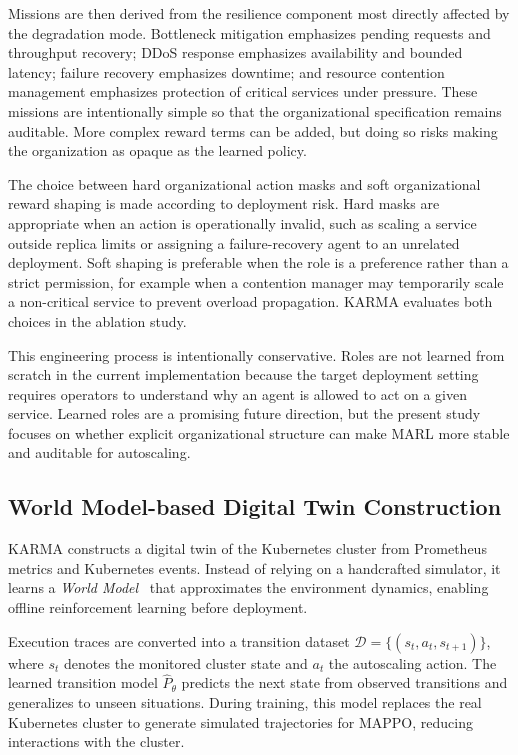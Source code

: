 \documentclass[journal]{IEEEtran}
\begin{document}
Missions are then derived from the resilience component most directly affected by the degradation mode. Bottleneck mitigation emphasizes pending requests and throughput recovery; DDoS response emphasizes availability and bounded latency; failure recovery emphasizes downtime; and resource contention management emphasizes protection of critical services under pressure. These missions are intentionally simple so that the organizational specification remains auditable. More complex reward terms can be added, but doing so risks making the organization as opaque as the learned policy.

The choice between hard organizational action masks and soft organizational reward shaping is made according to deployment risk. Hard masks are appropriate when an action is operationally invalid, such as scaling a service outside replica limits or assigning a failure-recovery agent to an unrelated deployment. Soft shaping is preferable when the role is a preference rather than a strict permission, for example when a contention manager may temporarily scale a non-critical service to prevent overload propagation. KARMA evaluates both choices in the ablation study.

This engineering process is intentionally conservative. Roles are not learned from scratch in the current implementation because the target deployment setting requires operators to understand why an agent is allowed to act on a given service. Learned roles are a promising future direction, but the present study focuses on whether explicit organizational structure can make MARL more stable and auditable for autoscaling.

\subsection{World Model-based Digital Twin Construction}

KARMA constructs a digital twin of the Kubernetes cluster from Prometheus metrics and Kubernetes events. Instead of relying on a handcrafted simulator, it learns a \emph{World Model}~\cite{ha2018world,planet2019,dreamer2020,mbpo2019} that approximates the environment dynamics, enabling offline reinforcement learning before deployment.

Execution traces are converted into a transition dataset
$\mathcal{D}=\{(s_t,a_t,s_{t+1})\}$,
where $s_t$ denotes the monitored cluster state and $a_t$ the autoscaling action. The learned transition model $\hat{P}_{\theta}$ predicts the next state from observed transitions and generalizes to unseen situations. During training, this model replaces the real Kubernetes cluster to generate simulated trajectories for MAPPO, reducing interactions with the cluster.
\end{document}
